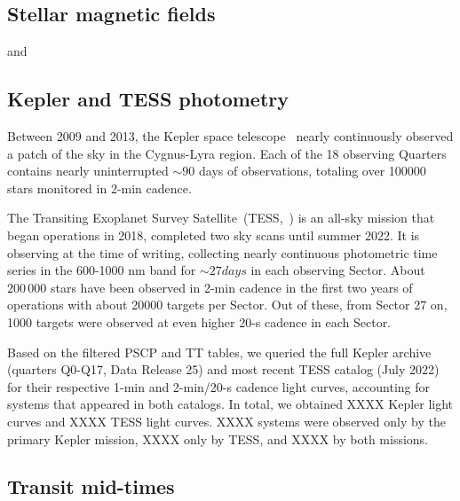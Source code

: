 \documentclass[twocolumn]{aastex631}
\begin{document}
\subsection{Stellar magnetic fields}
\cite{foster2022identifying} and \cite{reiners2022magnetism} 



\subsection{Kepler and TESS photometry}
Between 2009 and 2013, the Kepler space telescope~\citep{koch2010kepler} nearly continuously observed a patch of the sky in the Cygnus-Lyra region. Each of the 18 observing Quarters contains nearly uninterrupted $\sim 90$ days of observations, totaling over 100000 stars monitored in 2-min cadence. 

The Transiting Exoplanet Survey Satellite~(TESS,~\cite{ricker2015transiting}) is an all-sky mission that began operations in 2018, completed two sky scans until summer 2022. It is observing at the time of writing, collecting nearly continuous photometric time series in the 600-1000 nm band for $\sim 27 days$ in each observing Sector. About $200\,000$ stars have been observed in 2-min cadence in the first two years of operations with about 20000 targets per Sector. Out of these, from Sector 27 on, 1000 targets were observed at even higher 20-s cadence in each Sector. 

Based on the filtered PSCP and TT tables, we queried the full Kepler archive (quarters Q0-Q17, Data Release 25) and most recent TESS catalog (July 2022) for their respective 1-min and 2-min/20-s cadence light curves, accounting for systems that appeared in both catalogs. In total, we obtained XXXX Kepler light curves and XXXX TESS light curves. XXXX systems were observed only by the primary Kepler mission, XXXX only by TESS, and XXXX by both missions.

\subsection{Transit mid-times}
\end{document}
